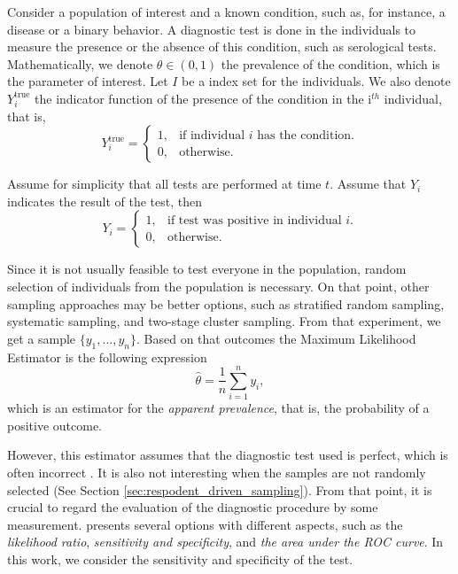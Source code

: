 Consider a population of interest and a known condition, such as, for instance,
a disease or a binary behavior. A diagnostic test is done in the individuals
to measure the presence or the absence of this condition, such as serological
tests. Mathematically, we denote
$\theta \in (0,1)$ the prevalence of the condition, which is the parameter of
interest. Let $I$ be a index set for the individuals. We also denote $Y^{\mathrm{true}}_i$ the indicator function of the presence of the
condition in the i$^{th}$ individual, that is, 
$$Y^{\mathrm{true}}_i = \begin{cases}
  1, &\text{if individual } i \text{ has the condition.} \\
  0, &\text{otherwise.}
\end{cases}$$

Assume for simplicity that all tests are performed at time $t$. Assume that
$Y_i$ indicates the result of the test, then 
$$Y_i = \begin{cases}
  1, &\text{if test was positive in individual } i. \\
  0, &\text{otherwise.}
\end{cases}$$

Since it is not usually feasible to test everyone in the population, random
selection of individuals from the population is necessary. On that point,
other sampling approaches may be better options, such as stratified random
sampling, systematic sampling, and two-stage cluster sampling. From that
experiment, we get a sample $\{y_1, ..., y_n\}$. Based on that outcomes the Maximum Likelihood Estimator is the following expression 
\begin{equation}
    \label{eq:naive-estimator}
    \hat{\theta} = \frac{1}{n}\sum_{i=1}^n y_i, 
\end{equation}
which is an estimator for the {\em apparent prevalence}, that is, the
probability of a positive outcome. 

However, this estimator assumes that the diagnostic test used is perfect,
which is often incorrect . It is also not
interesting when the samples are not randomly selected (See Section
\ref{sec:respodent_driven_sampling}). From that point, it is crucial to regard
the evaluation of the diagnostic procedure by some measurement. \textcite[p.
2]{vsimundic2009measures} presents several options with different aspects,
such as the {\em likelihood ratio}, {\em sensitivity and specificity}, and
{\em the area under the ROC curve}. In this work, we consider the sensitivity
and specificity of the test. 


